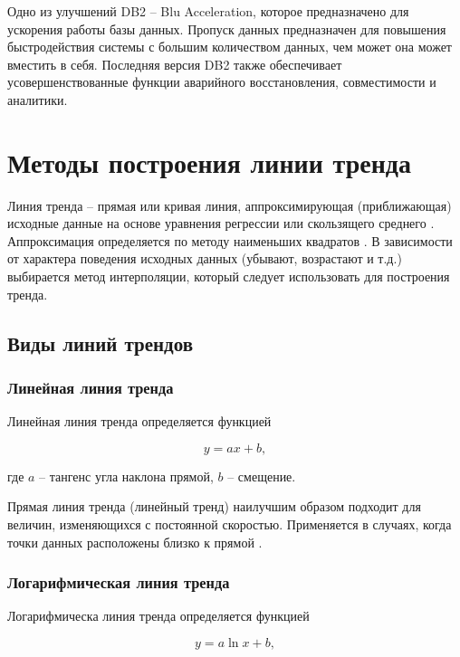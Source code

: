 \documentclass[a4paper,14pt]{extreport}
\begin{document}
Одно из улучшений DB2 -- Blu Acceleration, которое предназначено для ускорения работы базы данных. Пропуск данных предназначен для повышения быстродействия системы с большим количеством данных, чем может она может вместить в себя. Последняя версия DB2 также обеспечивает усовершенствованные функции аварийного восстановления, совместимости и аналитики.


\section{Методы построения линии тренда}

Линия тренда -- прямая или кривая линия, аппроксимирующая (приближающая) исходные данные на основе уравнения регрессии или скользящего среднего \cite{lt_exel}. Аппроксимация определяется по ме­тоду наименьших квадратов \cite{mnk}. В зависимости от характера поведения исходных данных (убыва­ют, возрастают и т.д.) выбирается метод интерполяции, который сле­дует использовать для построения тренда.

\subsection{Виды линий трендов}

\subsubsection*{Линейная линия тренда}

Линейная линия тренда определяется функцией

\begin{equation}
	y = ax + b,
\end{equation}

где $a$ -- тангенс угла наклона прямой, $b$ -- смещение.

Прямая линия тренда (линейный тренд) наилучшим образом подходит для величин, изменяющихся с постоянной скоростью. Приме­няется в случаях, когда точки данных расположены близко к прямой \cite{lt_exel}.

\subsubsection*{Логарифмическая линия тренда}

Логарифмическа линия тренда определяется функцией

\begin{equation}
	y = a\ln x + b,
\end{equation}
\end{document}
